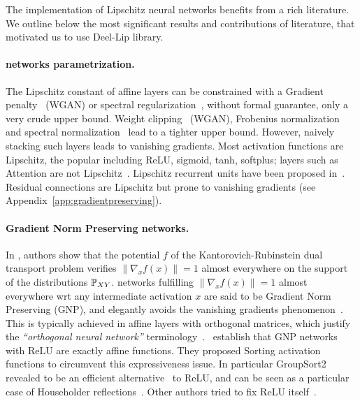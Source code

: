     The implementation of Lipschitz neural networks benefits from a rich literature. We outline below the most significant results and contributions of literature, that motivated us to use Deel-Lip library.
      
    \paragraph*{\LipCl networks parametrization.} The Lipschitz constant of affine layers can be constrained with a Gradient penalty~\cite{gulrajani2017improved} (WGAN) or spectral regularization~\cite{yoshida2017spectral}, without formal guarantee, only a very crude upper bound. Weight clipping~\cite{arjovsky2017wasserstein} (WGAN), Frobenius normalization~\cite{salimans2016weight} and spectral normalization~\cite{miyato2018spectral} lead to a tighter upper bound. However, naively stacking such layers leads to vanishing gradients. Most activation functions are Lipschitz, the popular including ReLU, sigmoid, tanh, softplus; layers such as Attention are not Lipschitz~\cite{kim2020lipschitz}. Lipschitz recurrent units have been proposed in~\cite{helfrich2018orthogonal,erichson2021lipschitz}. Residual connections are Lipschitz but prone to vanishing gradients (see Appendix~\ref{app:gradientpreserving}).  
      
    \paragraph*{Gradient Norm Preserving networks.} In \cite{gulrajani2017improved}, authors show that the potential $f$ of the Kantorovich-Rubinstein dual transport problem verifies $\|\nabla_x f(x)\|=1$ almost everywhere on the support of the distributions $\mathbb{P}_{XY}$.%
    \LipCl networks fulfilling $\|\nabla_x f(x)\|=1$ almost everywhere wrt any intermediate activation $x$ are said to be Gradient Norm Preserving (GNP), and elegantly avoids the vanishing gradients phenomenon~\cite{li2019preventing,bansal2018can}. This is typically achieved in affine layers with orthogonal matrices, which justify the \textit{``orthogonal neural network''} terminology~\cite{stasiak2006fast,li2019orthogonal}. \cite{anil2019sorting}~establish that GNP networks with ReLU are exactly affine functions. They proposed Sorting activation functions to circumvent this expressiveness issue. In particular GroupSort2 revealed to be an efficient alternative~\cite{tanielian2021approximating} to ReLU, and can be seen as a particular case of Householder reflections~\cite{mhammedi2017efficient,singla2021improved}. Other authors tried to fix ReLU itself~\cite{huang2021training}.      
      

